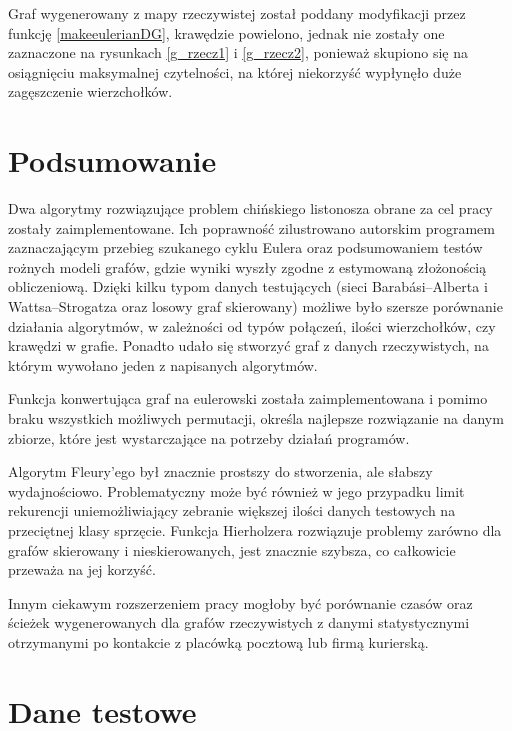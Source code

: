\documentclass[a4paper, 12pt, twoside, openright]{article}
\begin{document}
Graf wygenerowany z mapy rzeczywistej został poddany modyfikacji przez funkcję \ref{makeeulerianDG}, krawędzie powielono, jednak nie zostały one zaznaczone na rysunkach \ref{g_rzecz1} i \ref{g_rzecz2}, ponieważ skupiono się na osiągnięciu maksymalnej czytelności, na której niekorzyść wypłynęło duże zagęszczenie wierzchołków.

\newpage
\section{Podsumowanie}
\indent\par
	Dwa algorytmy rozwiązujące problem chińskiego listonosza obrane za cel pracy zostały zaimplementowane. Ich poprawność zilustrowano autorskim programem zaznaczającym przebieg szukanego cyklu Eulera oraz podsumowaniem testów rożnych modeli grafów, gdzie wyniki wyszły zgodne z estymowaną złożonością obliczeniową. Dzięki kilku typom danych testujących (sieci Barabási–Alberta i Wattsa–Strogatza oraz losowy graf skierowany) możliwe było szersze porównanie działania algorytmów, w zależności od typów połączeń, ilości wierzchołków, czy krawędzi w grafie. Ponadto udało się stworzyć graf z danych rzeczywistych, na którym wywołano jeden z napisanych algorytmów.
	
	Funkcja konwertująca graf na eulerowski została zaimplementowana i pomimo braku wszystkich możliwych permutacji, określa najlepsze rozwiązanie na danym zbiorze, które jest wystarczające na potrzeby działań programów.
	
	Algorytm Fleury'ego był znacznie prostszy do stworzenia, ale słabszy wydajnościowo. Problematyczny może być również w jego przypadku limit rekurencji uniemożliwiający zebranie większej ilości danych testowych na przeciętnej klasy sprzęcie.
	Funkcja Hierholzera rozwiązuje problemy zarówno dla grafów skierowany i nieskierowanych, jest znacznie szybsza, co całkowicie przeważa na jej korzyść.
	
	Innym ciekawym rozszerzeniem pracy mogłoby być porównanie czasów oraz ścieżek wygenerowanych dla grafów rzeczywistych z danymi statystycznymi otrzymanymi po kontakcie z placówką pocztową lub firmą kurierską.



\newpage


\section*{Dane testowe}
\end{document}
